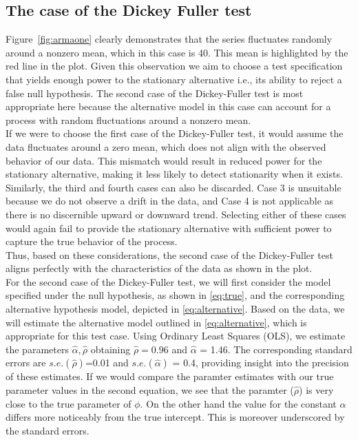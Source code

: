 \documentclass[12pt]{article}
\begin{document}
\subsection{The case of the Dickey Fuller test}
Figure~\ref{fig:armaone} clearly demonstrates that the series fluctuates randomly around a nonzero mean, which in this case is 40. This mean is highlighted by the red line in the plot.
Given this observation we aim to choose a test specification that yields enough power to the stationary alternative i.e., its ability to reject a false null hypothesis.
The second case of the Dickey-Fuller test is most appropriate here because the alternative model in this case can account for a process with random fluctuations around a nonzero mean. \\
If we were to choose the first case of the Dickey-Fuller test, it would assume the data fluctuates around a zero mean, which does not align with the observed behavior of our data.
 This mismatch would result in reduced power for the stationary alternative, making it less likely to detect stationarity when it exists.\\
Similarly, the third and fourth cases can also be discarded. Case 3 is unsuitable because we do not observe a drift in the data, and Case 4 is not applicable as there is no discernible upward or downward trend. Selecting either of these cases would again fail to provide the stationary alternative with sufficient power to capture the true behavior of the process.\\
Thus, based on these considerations, the second case of the Dickey-Fuller test aligns perfectly with the characteristics of the data as shown in the plot.\\
For the second case of the Dickey-Fuller test, we will first consider the model specified under the null hypothesis, as shown in \eqref{eq:true}, and the corresponding alternative hypothesis model, depicted in \eqref{eq:alternative}. Based on the data, we will estimate the alternative model outlined in \eqref{eq:alternative}, which is appropriate for this test case.
Using Ordinary Least Squares (OLS), we estimate the parameters $\hat{\alpha}, \hat{\rho}$ obtaining $\hat{\rho} = 0.96$ and $\hat{\alpha}$ = 1.46. The corresponding standard errors are $s.e.(\hat{\rho})$=0.01 and 
$s.e.(\hat{\alpha})$ = 0.4, providing insight into the precision of these estimates.
If we would compare the  paramter estimates with our true parameter values in the second equation, we see that the paramter ($\hat{\rho}$) is very close to the true parameter of $\phi$. On the other hand the value for the constant $\alpha$ differs more noticeably from the true intercept. This is moreover underscored by the standard errors.
\end{document}

